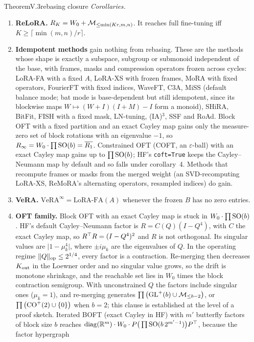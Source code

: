 \begin{restate}{Theorem}{V.3}{rebasing closure}
\emph{Corollaries.}
\begin{enumerate}[label=\arabic*.,leftmargin=1.6em]
  \item \textbf{ReLoRA.} $R_K=W_0+\mathcal{M}_{\le\min(Kr,m,n)}$. It reaches full fine-tuning iff $K\ge\lceil\min(m,n)/r\rceil$.
  \item \textbf{Idempotent methods} gain nothing from rebasing. These are the methods whose shape is exactly a subspace,
  subgroup or submonoid independent of the base, with frames, masks and compression operators frozen across cycles:
  LoRA-FA with a fixed $A$, LoRA-XS with frozen frames, MoRA with fixed operators, FourierFT with fixed indices, WaveFT,
  C3A, MiSS (default balance mode; bat mode is base-dependent but still idempotent, since its blockwise maps
  $W\mapsto(W+I)(I+M)-I$ form a monoid), SHiRA, BitFit, FISH with a fixed mask, LN-tuning, (IA)$^3$, SSF and RoAd. Block OFT
  with a fixed partition and an exact Cayley map gains only the measure-zero set of block rotations with an eigenvalue
  $-1$, so $R_\infty=W_0\cdot\prod\mathrm{SO}(b)=\overline{R_1}$. Constrained OFT (COFT, an $\varepsilon$-ball) with an exact Cayley
  map gains up to $\prod\mathrm{SO}(b)$; HF's \texttt{coft=True} keeps the Cayley--Neumann map by default and so falls under
  corollary~4. Methods that recompute frames or masks from the merged weight (an SVD-recomputing LoRA-XS, ReMoRA's
  alternating operators, resampled indices) do gain.
  \item \textbf{VeRA.} $\mathrm{VeRA}^\infty=\text{LoRA-FA}(A)$ whenever the frozen $B$ has no zero entries.
  \item \textbf{OFT family.} Block OFT with an exact Cayley map is stuck in $W_0\cdot\prod\mathrm{SO}(b)$. HF's default
  Cayley--Neumann factor is $R=C(Q)(I-Q^4)$, with $C$ the exact Cayley map, so $R^{\top} R=(I-Q^4)^2$ and $R$ is not orthogonal.
  Its singular values are $\lvert1-\mu_k^4\rvert$, where $\pm i\mu_k$ are the eigenvalues of $Q$. In the operating regime
  $\lVert Q\rVert_{\rm op}\le2^{1/4}$, every factor is a contraction. Re-merging then decreases $K_{\rm out}$ in the
  Loewner order and no singular value grows, so the drift is monotone shrinkage, and the reachable set lies in $W_0$ times
  the block contraction semigroup. With unconstrained $Q$ the factors include singular ones ($\mu_k=1$), and re-merging
  generates $\prod\big(\mathrm{GL}^+(b)\cup\mathcal{M}_{\le b-2}\big)$, or $\prod\big(\mathrm{CO}^+(2)\cup\{0\}\big)$ when $b=2$; this clause is
  established at the level of a proof sketch. Iterated BOFT (exact Cayley in HF) with $m'$ butterfly factors
  of block size $b$ reaches $\operatorname{diag}(\mathbb{R}^m)\cdot W_0\cdot P\big(\prod\mathrm{SO}(b\,2^{m'-1})\big)P^{\top}$, because the factor hypergraph

\end{enumerate}
\end{restate}
